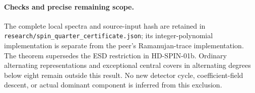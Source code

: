 \paragraph{Checks and precise remaining scope.}
The complete local spectra and source-input hash are retained in
\texttt{research/spin\_quarter\_certificate.json}; its integer-polynomial
implementation is separate from the peer's Ramanujan-trace
implementation.  The theorem supersedes the ESD restriction in
HD-SPIN-01b.  Ordinary alternating representations and exceptional
central covers in alternating degrees below eight remain outside
this result.  No new detector cycle, coefficient-field descent,
or actual dominant component is inferred from this exclusion.
